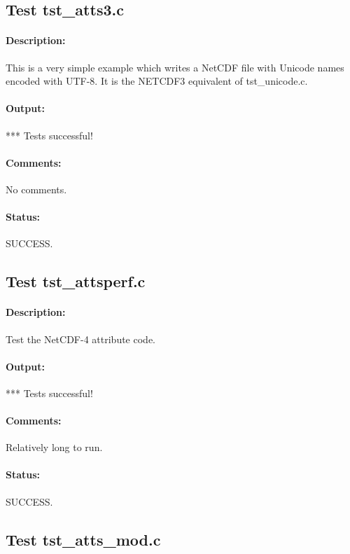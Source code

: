\subsection{Test tst\_atts3.c}

\paragraph{Description:} This is a very simple example which writes a NetCDF file with Unicode names encoded with UTF-8. It is the NETCDF3 equivalent of tst\_unicode.c.

\paragraph{Output:} *** Tests successful!

\paragraph{Comments:} No comments.

\paragraph{Status:} SUCCESS.

\subsection{Test tst\_attsperf.c}

\paragraph{Description:} Test the NetCDF-4 attribute code.

\paragraph{Output:} *** Tests successful!

\paragraph{Comments:} Relatively long to run.

\paragraph{Status:} SUCCESS.

\subsection{Test tst\_atts\_mod.c}

